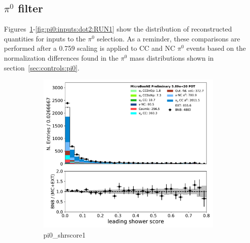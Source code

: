 \subsection{$\pi^0$ filter}
\label{app:pi0:input}
\par Figures~\ref{fig:pi0:inputs:shrscore1:RUN1}-\ref{fig:pi0:inputs:dot2:RUN1} show the distribution of reconstructed quantities for inputs to the $\pi^0$ selection. As a reminder, these comparisons are performed after a 0.759 scaling is applied to CC and NC $\pi^0$ events based on the normalization differences found in the $\pi^0$ mass distributions shown in section~\ref{sec:controls:pi0}.

\begin{figure}[H] 
\begin{center}
    \begin{subfigure}[b]{0.3\textwidth}
    \centering
    \includegraphics[width=1.00\textwidth]{pi0/inputs/pi0_shrscore1_03182020_presel.pdf}
    \caption{\label{fig:pi0:inputs:shrscore1:RUN1} pi0\_shrscore1}
    \end{subfigure}
    \begin{subfigure}[b]{0.3\textwidth}
    \centering

\end{subfigure}
\end{center}
\end{figure}
